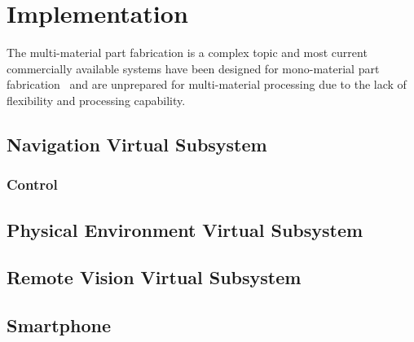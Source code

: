 \chapter{Implementation}%
\label{ch:implementation}
  The multi-material part fabrication is a complex topic and most current
  commercially available systems have been designed for mono-material part
  fabrication~\cite{wohlers2011wohlers} and are unprepared for multi-material
  processing due to the lack of flexibility and processing capability.
%
\section{Navigation Virtual Subsystem}%
\label{sec:navig-virt-subsyst-implem}
%
%
\subsection{Control}%
\label{sec:control-design}
%
%
\section{Physical Environment Virtual Subsystem}%
\label{sec:phys-envir-virt-design}
%
%
\section{Remote Vision Virtual Subsystem}%
\label{sec:remote-visi-subsyst-design}
%
%
\section{Smartphone}%
\label{sec:smartphone-design}
% 
%
